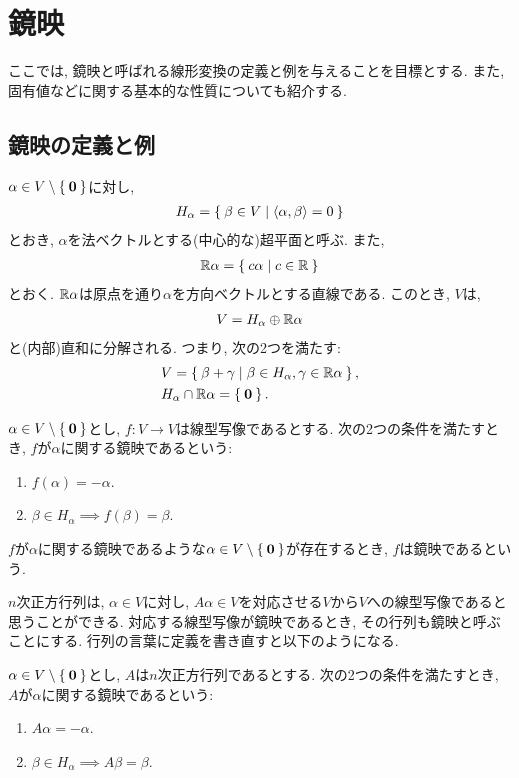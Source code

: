 \chapter{鏡映}

ここでは,
鏡映と呼ばれる線形変換の定義と例を与えることを目標とする.
また,
固有値などに関する基本的な性質についても紹介する.

\section{鏡映の定義と例}


$\alpha \in V\setminus\Set{\boldsymbol{0}}$に対し,
\begin{align*}
  H_\alpha = \Set{\beta \in V | \Braket{\alpha,\beta}=0}
\end{align*}
とおき, $\alpha$を法ベクトルとする(中心的な)超平面と呼ぶ.
また,
\begin{align*}
  \mathbb{R}\alpha = \Set{c \alpha | c\in \mathbb{R}}
\end{align*}
とおく. $\mathbb{R}\alpha$は原点を通り$\alpha$を方向ベクトルとする直線である.
このとき, $V$は,
\begin{align*}
  V =   H_\alpha \oplus   \mathbb{R}\alpha
\end{align*}
と(内部)直和に分解される.
つまり, 次の2つを満たす:
\begin{align*}
  &V = \Set{ \beta + \gamma | \beta \in H_\alpha, \gamma \in \mathbb{R}\alpha},\\
  &H_\alpha \cap   \mathbb{R}\alpha =\Set{\boldsymbol{0}}.
\end{align*}

\begin{definition}
  $\alpha \in V\setminus\Set{\boldsymbol{0}}$とし,
  $f\colon V\to V$は線型写像であるとする.
  次の2つの条件を満たすとき,
  $f$が$\alpha$に関する鏡映であるという:
  \begin{enumerate}
  \item $f(\alpha)=-\alpha$.
  \item $\beta \in H_\alpha \implies f(\beta)=\beta$.    
  \end{enumerate}
  $f$が$\alpha$に関する鏡映であるような$\alpha\in V\setminus\Set{\boldsymbol{0}}$が存在するとき,
  $f$は鏡映であるという.
\end{definition}
$n$次正方行列は,
$\alpha\in V$に対し,
$A\alpha\in V$を対応させる$V$から$V$への線型写像であると思うことができる.
対応する線型写像が鏡映であるとき, その行列も鏡映と呼ぶことにする.
行列の言葉に定義を書き直すと以下のようになる.
\begin{definition}
  $\alpha \in V\setminus\Set{\boldsymbol{0}}$とし,
  $A$は$n$次正方行列であるとする.
  次の2つの条件を満たすとき,
  $A$が$\alpha$に関する鏡映であるという:
  \begin{enumerate}
  \item $A\alpha=-\alpha$.
  \item $\beta \in H_\alpha \implies A\beta=\beta$.    
  \end{enumerate}
\end{definition}

